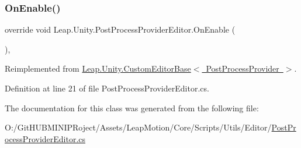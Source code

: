 \subsubsection{\texorpdfstring{OnEnable()}{OnEnable()}}
{\footnotesize\ttfamily override void Leap.\+Unity.\+Post\+Process\+Provider\+Editor.\+On\+Enable (\begin{DoxyParamCaption}{ }\end{DoxyParamCaption})\hspace{0.3cm}{\ttfamily [protected]}, {\ttfamily [virtual]}}



Reimplemented from \mbox{\hyperlink{class_leap_1_1_unity_1_1_custom_editor_base_a2268bc01655342bd3da5ae015bfa2f93}{Leap.\+Unity.\+Custom\+Editor\+Base$<$ Post\+Process\+Provider $>$}}.



Definition at line 21 of file Post\+Process\+Provider\+Editor.\+cs.



The documentation for this class was generated from the following file\+:\begin{DoxyCompactItemize}
\item 
O\+:/\+Git\+H\+U\+B\+M\+I\+N\+I\+P\+Roject/\+Assets/\+Leap\+Motion/\+Core/\+Scripts/\+Utils/\+Editor/\mbox{\hyperlink{_post_process_provider_editor_8cs}{Post\+Process\+Provider\+Editor.\+cs}}\end{DoxyCompactItemize}

